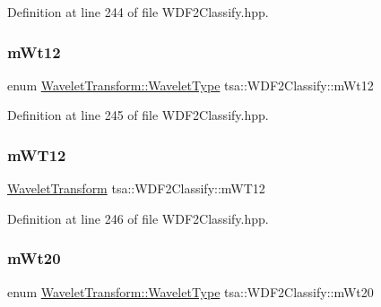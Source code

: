 Definition at line 244 of file W\+D\+F2\+Classify.\+hpp.

\mbox{\label{classtsa_1_1_w_d_f2_classify_a680bfb1cce916b4f0c8dde32c9b5ba56}} 
\subsubsection{\texorpdfstring{m\+Wt12}{mWt12}}
{\footnotesize\ttfamily enum \hyperlink{classtsa_1_1_wavelet_transform_a5a529de70e0004333fcf23b9cca88ce7}{Wavelet\+Transform\+::\+Wavelet\+Type} tsa\+::\+W\+D\+F2\+Classify\+::m\+Wt12\hspace{0.3cm}{\ttfamily [private]}}



Definition at line 245 of file W\+D\+F2\+Classify.\+hpp.

\mbox{\label{classtsa_1_1_w_d_f2_classify_ac8e6dc4957dfa6f59ff7ccc29f2ce43d}} 
\subsubsection{\texorpdfstring{m\+W\+T12}{mWT12}}
{\footnotesize\ttfamily \hyperlink{classtsa_1_1_wavelet_transform}{Wavelet\+Transform} tsa\+::\+W\+D\+F2\+Classify\+::m\+W\+T12\hspace{0.3cm}{\ttfamily [private]}}



Definition at line 246 of file W\+D\+F2\+Classify.\+hpp.

\mbox{\label{classtsa_1_1_w_d_f2_classify_a1d1fd6a041771fb798fedf0a5cf93c0e}} 
\subsubsection{\texorpdfstring{m\+Wt20}{mWt20}}
{\footnotesize\ttfamily enum \hyperlink{classtsa_1_1_wavelet_transform_a5a529de70e0004333fcf23b9cca88ce7}{Wavelet\+Transform\+::\+Wavelet\+Type} tsa\+::\+W\+D\+F2\+Classify\+::m\+Wt20\hspace{0.3cm}{\ttfamily [private]}}



